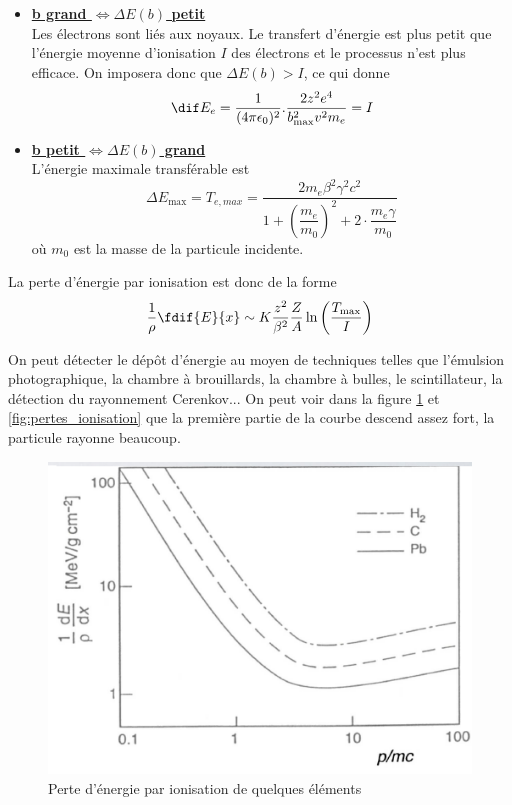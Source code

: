 \begin{itemize}[label=$\rightarrow$]
    \item \underline{\textbf{b grand $\Leftrightarrow\Delta E(b)$ petit}}\\[0,2cm]
    Les électrons sont liés aux noyaux. Le transfert d'énergie est plus petit que l'énergie moyenne d'ionisation $I$ des électrons et le processus n'est plus efficace. On imposera donc que $\Delta E(b) > I$, ce qui donne
    \[
        \dif E_e=\dfrac{1}{(4\pi \epsilon_0)^2}.\dfrac{2z^2e^4}{b_\text{max}^2v^2m_e}=I
    \]
    \item \underline{\textbf{b petit $\Longleftrightarrow\Delta E(b)$ grand}}\\[0,2cm]
    L'énergie maximale transférable est
    \[
        \Delta E_\text{max}=T_{e,max}=\dfrac{2m_e\beta^2\gamma^2c^2}{1+\left(\dfrac{m_e}{m_0}\right)^2+2\cdot\dfrac{m_e\gamma}{m_0}}
    \]
    où $m_0$ est la masse de la particule incidente.
\end{itemize}
La perte d'énergie par ionisation est donc de la forme
\[
    \dfrac{1}{\rho}\fdif{E}{x} \sim K\dfrac{z^2}{\beta^2}\dfrac{Z}{A}  \ln{\left(\dfrac{T_\text{max}}{I}\right)}
\]

On peut détecter le dépôt d'énergie au moyen de techniques telles que l'émulsion photographique, la chambre à brouillards, la chambre à bulles, le scintillateur, la détection du rayonnement Cerenkov...
On peut voir dans la figure \ref{fig:perte_energie} et \ref{fig:pertes_ionisation} que la première partie de la courbe descend assez fort, la particule rayonne beaucoup.

\begin{figure}[ht]
    \centering
    \includegraphics[scale=0.60]{Images1/perteenergie.PNG}
    \caption{Perte d'énergie par ionisation de quelques éléments}
    \label{fig:perte_energie}
\end{figure}

